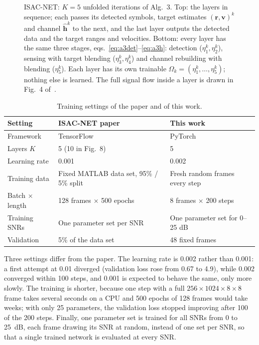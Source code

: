\documentclass[11pt,a4paper]{article}
\begin{document}
\begin{figure}[H]
{}
\caption{ISAC-NET: $K=5$ unfolded iterations of Alg.~3. Top: the layers in sequence; each passes its detected symbols, target estimates $(\mathbf r,\mathbf v)^k$ and channel $\hat{\mathbf h}^k$ to the next, and the last layer outputs the detected data and the target ranges and velocities. Bottom: every layer has the same three stages, eqs.~\eqref{eq:a3det}--\eqref{eq:a3h}: detection ($\eta_1^k,\eta_2^k$), sensing with target blending ($\eta_3^k,\eta_4^k$) and channel rebuilding with blending ($\eta_5^k$). Each layer has its own trainable $\Omega_k=(\eta_1^k,\dots,\eta_5^k)$; nothing else is learned. The full signal flow inside a layer is drawn in Fig.~4 of~\cite{isacnet}.}
\label{fig:arch}
\end{figure}

\begin{table}[H]
\centering\small
\begin{tabular}{lll}
\toprule
Setting & ISAC-NET paper~\cite[Sec.~IV-B]{isacnet} & This work \\
\midrule
Framework & TensorFlow & PyTorch \\
Layers $K$ & 5 (10 in Fig.~8) & 5 \\
Learning rate & 0.001 & 0.002 \\
Training data & Fixed MATLAB data set, 95\% / 5\% split & Fresh random frames every step \\
Batch $\times$ length & 128 frames $\times$ 500 epochs & 8 frames $\times$ 200 steps \\
Training SNRs & One parameter set per SNR & One parameter set for 0--25 dB \\
Validation & 5\% of the data set & 48 fixed frames \\
\bottomrule
\end{tabular}
\caption{Training settings of the paper and of this work.}
\label{tab:train}
\end{table}

Three settings differ from the paper. The learning rate is 0.002 rather than 0.001: a first attempt at 0.01 diverged (validation loss rose from 0.67 to 4.9), while 0.002 converged within 100 steps, and 0.001 is expected to behave the same, only more slowly. The training is shorter, because one step with a full $256\times1024\times8\times8$ frame takes several seconds on a CPU and 500 epochs of 128 frames would take weeks; with only 25 parameters, the validation loss stopped improving after 100 of the 200 steps. Finally, one parameter set is trained for all SNRs from 0 to 25~dB, each frame drawing its SNR at random, instead of one set per SNR, so that a single trained network is evaluated at every SNR.
\end{document}
